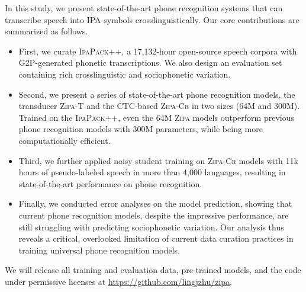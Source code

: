 \documentclass[11pt]{article}
\begin{document}
In this study, we present state-of-the-art phone recognition systems that can transcribe speech into IPA symbols crosslinguistically. Our core contributions are summarized as follows. 
\vspace{-0.05in}
\begin{itemize}
    \setlength{\parskip}{1pt}  %
    \item First, we curate \textsc{IpaPack++}, a 17,132-hour open-source speech corpora with G2P-generated phonetic transcriptions. We also design an evaluation set containing rich crosslinguistic and sociophonetic variation. 
    \item Second, we present a series of state-of-the-art phone recognition models, the transducer \textsc{Zipa-T} and the CTC-based \textsc{Zipa-Cr} in two sizes (64M and 300M). Trained on the \textsc{IpaPack++}, even the 64M \textsc{Zipa} models outperform previous phone recognition models with 300M parameters, while being more computationally efficient. 
    \item Third, we further applied noisy student training on \textsc{Zipa-Cr} models with 11k hours of pseudo-labeled speech in more than 4,000 languages, resulting in state-of-the-art performance on phone recognition. 
    \item Finally, we conducted error analyses on the model prediction, showing that current phone recognition models, despite the impressive performance, are still struggling with predicting sociophonetic variation. Our analysis thus reveals a critical, overlooked limitation of current data curation practices in training universal phone recognition models.
\end{itemize}
We will release all training and evaluation data, pre-trained models, and the code under permissive licenses at \url{https://github.com/lingjzhu/zipa}.
\end{document}
